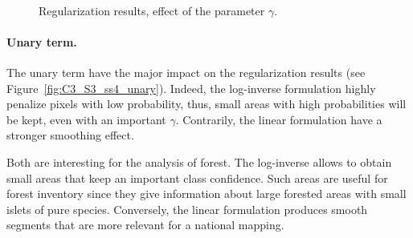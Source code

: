 \begin{figure}[htbp]
\begin{center}
{\label{subfig:C3_S3_ss4_gammad}
}
\\
\hspace*{0.025\textwidth}
\endgroup
\caption{Regularization results, effect of the parameter $\gamma$.}
\label{fig:C3_S3_ss4_gamma}
\end{center}
\end{figure}

\paragraph{Unary term. \\}

The unary term have the major impact on the regularization results (see Figure~\ref{fig:C3_S3_ss4_unary}). Indeed, the log-inverse formulation highly penalize pixels with low probability, thus, small areas with high probabilities will be kept, even with an important $\gamma$. Contrarily, the linear formulation have a stronger smoothing effect.

Both are interesting for the analysis of forest. The log-inverse allows to obtain small areas that keep an important class confidence. Such areas are useful for forest inventory since they give information about large forested areas with small islets of pure species. Conversely, the linear formulation produces smooth segments that are more relevant for a national mapping.

